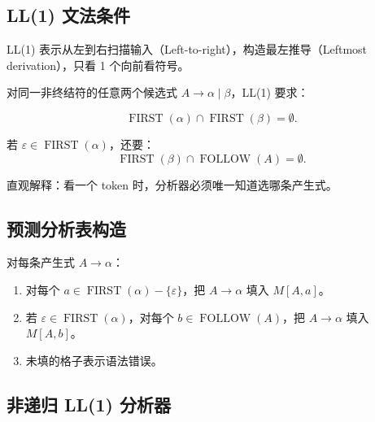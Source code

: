 \documentclass[UTF8,fontset=none,11pt]{ctexart}
\newenvironment{defbox}[1][]{%
  \par\medskip\noindent{\color{defrule}\rule{\linewidth}{1.1pt}}\par\nopagebreak
  \noindent{\bfseries\color{defrule}#1}\par\nopagebreak\smallskip}%
  {\par\nopagebreak\smallskip\noindent{\color{defrule}\rule{\linewidth}{0.4pt}}\par\medskip}
\newcommand{\eps}{\varepsilon}
\newcommand{\FIRST}{\operatorname{FIRST}}
\newcommand{\FOLLOW}{\operatorname{FOLLOW}}
\begin{document}
\subsection{LL(1) 文法条件}

\begin{defbox}[LL(1)]
LL(1) 表示从左到右扫描输入（Left-to-right），构造最左推导（Leftmost derivation），只看 1 个向前看符号。
\end{defbox}

对同一非终结符的任意两个候选式 \(A\to\alpha\mid\beta\)，LL(1) 要求：

\[
\FIRST(\alpha)\cap\FIRST(\beta)=\emptyset.
\]

若 \(\eps\in\FIRST(\alpha)\)，还要：
\[
\FIRST(\beta)\cap\FOLLOW(A)=\emptyset.
\]

直观解释：看一个 token 时，分析器必须唯一知道选哪条产生式。

\subsection{预测分析表构造}

对每条产生式 \(A\to\alpha\)：

\begin{enumerate}
  \item 对每个 \(a\in\FIRST(\alpha)-\{\eps\}\)，把 \(A\to\alpha\) 填入 \(M[A,a]\)。
  \item 若 \(\eps\in\FIRST(\alpha)\)，对每个 \(b\in\FOLLOW(A)\)，把 \(A\to\alpha\) 填入 \(M[A,b]\)。
  \item 未填的格子表示语法错误。
\end{enumerate}

\begin{center}
\end{center}

\subsection{非递归 LL(1) 分析器}
\end{document}
